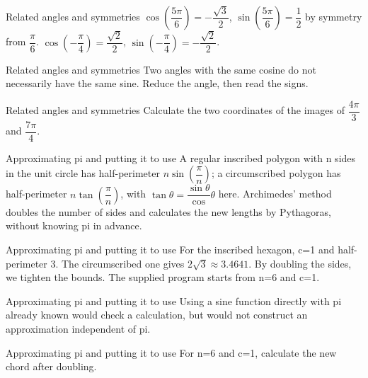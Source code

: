 \documentclass[aspectratio=169,10pt]{beamer}
\begin{document}
\begin{frame}{Related angles and symmetries}
\(\cos (\dfrac{5\pi}{6})=-\dfrac{\sqrt 3}{2}\), \(\sin (\dfrac{5\pi}{6})=\dfrac{1}{2}\) by symmetry from \(\dfrac{\pi}{6}\). \(\cos (-\dfrac{\pi}{4})=\dfrac{\sqrt 2}{2}\), \(\sin (-\dfrac{\pi}{4})=-\dfrac{\sqrt 2}{2}\).
\end{frame}
\begin{frame}{Related angles and symmetries}
Two angles with the same cosine do not necessarily have the same sine. Reduce the angle, then read the signs.
\end{frame}
\begin{frame}{Related angles and symmetries}
Calculate the two coordinates of the images of \(\dfrac{4\pi}{3}\) and \(\dfrac{7\pi}{4}\).
\end{frame}
\begin{frame}{Approximating pi and putting it to use}
A regular inscribed polygon with n sides in the unit circle has half-perimeter \(n\sin (\dfrac{\pi}{n})\); a circumscribed polygon has half-perimeter \(n\tan (\dfrac{\pi}{n})\), with \(\tan \theta =\dfrac{\sin \theta}{\cos}\theta \) here. Archimedes' method doubles the number of sides and calculates the new lengths by Pythagoras, without knowing pi in advance.
\end{frame}
\begin{frame}{Approximating pi and putting it to use}
For the inscribed hexagon, c=1 and half-perimeter 3. The circumscribed one gives \(2\sqrt3\approx3.4641\). By doubling the sides, we tighten the bounds. The supplied program starts from n=6 and c=1.
\end{frame}
\begin{frame}{Approximating pi and putting it to use}
Using a sine function directly with pi already known would check a calculation, but would not construct an approximation independent of pi.
\end{frame}
\begin{frame}{Approximating pi and putting it to use}
For n=6 and c=1, calculate the new chord after doubling.
\end{frame}
\end{document}
